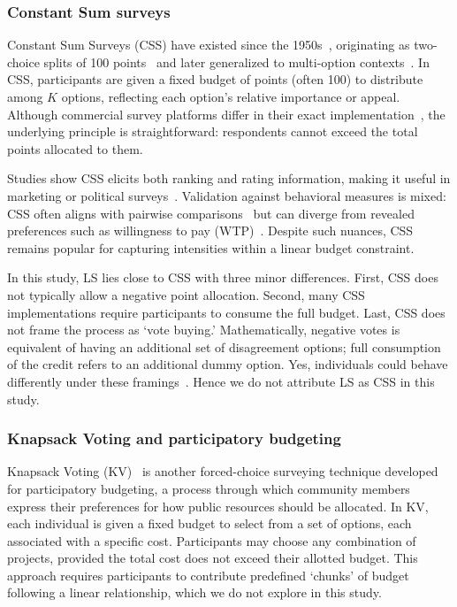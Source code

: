 \subsubsection{Constant Sum surveys}
Constant Sum Surveys (CSS) have existed since the 1950s~\cite{Malhotra_Naresh_K_2012, smithBasicMarketingResearch2013, Donald_R_Cooper2013-03-05}, originating as two-choice splits of 100 points~\cite{metfesselProposalQuantitativeReporting1947} and later generalized to multi-option contexts~\cite{zhuSelfestimationWeightParameter1991, harwoodUnderstandingImplicitExplicit2019}. In CSS, participants are given a fixed budget of points (often 100) to distribute among $K$ options, reflecting each option’s relative importance or appeal. Although commercial survey platforms differ in their exact implementation~\cite{qualtricsConstantSumQuestion2025,surveysparrowWhatConstantSum2025,lorraineConstantSumQuestion2022}, the underlying principle is straightforward: respondents cannot exceed the total points allocated to them.

Studies show CSS elicits both ranking and rating information, making it useful in marketing or political surveys~\cite{collewetPreferenceEstimationPoint2023}. Validation against behavioral measures is mixed: CSS often aligns with pairwise comparisons~\cite{dudekValidityPointAssignmentProcedure1957} but can diverge from revealed preferences such as willingness to pay (WTP)~\cite{louviereComparisonImportanceWeights2008}. Despite such nuances, CSS remains popular for capturing intensities within a linear budget constraint.

In this study, LS lies close to CSS with three minor differences. First, CSS does not typically allow a negative point allocation. Second, many CSS implementations require participants to consume the full budget. Last, CSS does not frame the process as `vote buying.'  Mathematically, negative votes is equivalent of having an additional set of disagreement options; full consumption of the credit refers to an additional dummy option. Yes, individuals could behave differently under these framings~\cite{shahScarcityFramesValue2015, kahnemanProspectTheoryAnalysis1979}. Hence we do not attribute LS as CSS in this study.

\subsubsection{Knapsack Voting and participatory budgeting}
Knapsack Voting (KV)~\cite{goelBudgetAggregationKnapsack, goelKnapsackVotingVoting} is another forced-choice surveying technique developed for participatory budgeting, a process through which community members express their preferences for how public resources should be allocated. In KV, each individual is given a fixed budget to select from a set of options, each associated with a specific cost. Participants may choose any combination of projects, provided the total cost does not exceed their allotted budget. This approach requires participants to contribute predefined `chunks' of budget following a linear relationship, which we do not explore in this study.

